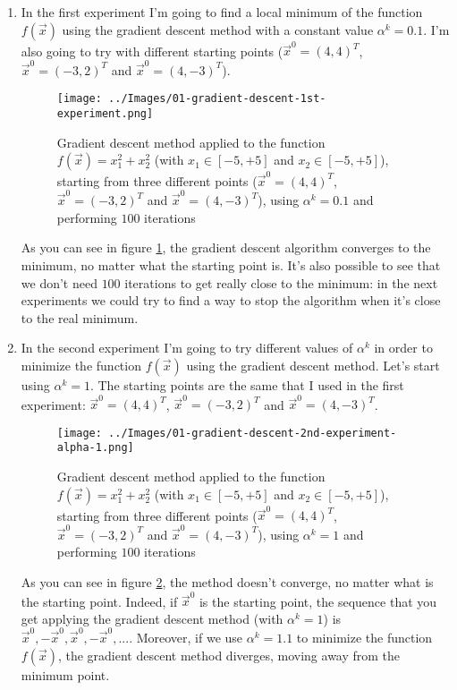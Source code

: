         \begin{enumerate}
            \item In the first experiment I'm going to find a local minimum of the function \(f(\vec{x})\) using the gradient descent method with a constant value \(\alpha^k = 0.1\). I'm also going to try with different starting points (\(\vec{x}^0 = (4,4)^T\), \(\vec{x}^0 = (-3,2)^T\) and \(\vec{x}^0 = (4,-3)^T\)).
            \begin{figure}
                \centering
                \texttt{[image: ../Images/01-gradient-descent-1st-experiment.png]}
                \caption{Gradient descent method applied to the function \(f(\vec{x}) = x_{1}^{2} + x_{2}^{2}\) (with \(x_1 \in [-5, +5]\) and \(x_2 \in [-5, +5]\)), starting from three different points (\(\vec{x}^0 = (4,4)^T\), \(\vec{x}^0 = (-3,2)^T\) and \(\vec{x}^0 = (4,-3)^T\)), using \(\alpha^k = 0.1\) and performing \(100\) iterations}
                \label{gradient-descent-1st-experiment}
            \end{figure}
            As you can see in figure \ref{gradient-descent-1st-experiment}, the gradient descent algorithm converges to the minimum, no matter what the starting point is. It's also possible to see that we don't need \(100\) iterations to get really close to the minimum: in the next experiments we could try to find a way to stop the algorithm when it's close to the real minimum.
            \item In the second experiment I'm going to try different values of \(\alpha^k\) in order to minimize the function \(f(\vec{x})\) using the gradient descent method. Let's start using \(\alpha^k = 1\). The starting points are the same that I used in the first experiment: \(\vec{x}^0 = (4,4)^T\), \(\vec{x}^0 = (-3,2)^T\) and \(\vec{x}^0 = (4,-3)^T\).
            \begin{figure}
                \centering
                \texttt{[image: ../Images/01-gradient-descent-2nd-experiment-alpha-1.png]}
                \caption{Gradient descent method applied to the function \(f(\vec{x}) = x_{1}^{2} + x_{2}^{2}\) (with \(x_1 \in [-5, +5]\) and \(x_2 \in [-5, +5]\)), starting from three different points (\(\vec{x}^0 = (4,4)^T\), \(\vec{x}^0 = (-3,2)^T\) and \(\vec{x}^0 = (4,-3)^T\)), using \(\alpha^k = 1\) and performing \(100\) iterations}
                \label{gradient-descent-2nd-experiment-alpha-1}
            \end{figure}
            As you can see in figure \ref{gradient-descent-2nd-experiment-alpha-1}, the method doesn't converge, no matter what is the starting point. Indeed, if \(\vec{x}^0\) is the starting point, the sequence that you get applying the gradient descent method (with \(\alpha^k = 1\)) is \(\vec{x}^0, -\vec{x}^0, \vec{x}^0, -\vec{x}^0, ...\). Moreover, if we use \(\alpha^k = 1.1\) to minimize the function \(f(\vec{x})\), the gradient descent method diverges, moving away from the minimum point.

\end{enumerate}
